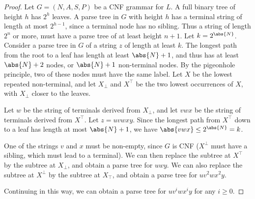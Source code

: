 \begin{proof}
    Let $G = (N, A, S, P)$ be a CNF grammar for $L$.
    A full binary tree of height $h$ has $2^h$ leaves.
    A parse tree in $G$ with height $h$ has a terminal string of length at
    most $2^{h-1}$, since a terminal node has no sibling.
    Thus a string of length $2^n$ or more, must have a parse tree of at
    least height $n+1$.
    Let $k = 2^{\abs{N}}$.
    Consider a parse tree in $G$ of a string $z$ of length at least $k$.
    The longest path from the root to a leaf has length at least
    $\abs{N}+1$, and thus has at least $\abs{N} + 2$ nodes, or $\abs{N} + 1$
    non-terminal nodes.
    By the pigeonhole principle, two of these nodes must have the same
    label.
    Let $X$ be the lowest repeated non-terminal, and let $X_\bot$ and
    $X^\top$ be the two lowest occurrences of $X$, with $X_\bot$ closer to
    the leaves.

    Let $w$ be the string of terminals derived from $X_\bot$, and let
    $vwx$ be the string of terminals derived from $X^\top$.
    Let $z = uvwxy$.
    Since the longest path from $X^\top$ down to a leaf has length at most
    $\abs{N} + 1$, we have $\abs{vwx} \le 2^{\abs{N}} = k$.

    One of the strings $v$ and $x$ must be non-empty, since $G$ is CNF
    ($X^\bot$ must have a sibling, which must lead to a terminal).
    We can then replace the subtree at $X^\top$ by the subtree at $X_\bot$,
    and obtain a parse tree for $uwy$.
    We can also replace the subtree at $X^\bot$ by the subtree at $X_\top$,
    and obtain a parse tree for $uv^2wx^2y$.

    Continuing in this way, we can obtain a parse tree for $uv^iwx^iy$ for
    any $i \ge 0$.
\end{proof}

